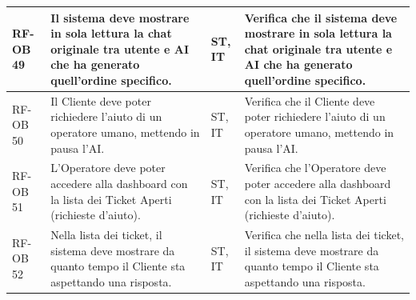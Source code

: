 \documentclass[a4paper,11pt,oneside]{scrartcl}
\begin{document}
\begin{longtable}{|p{1.5cm}|p{4.5cm}|p{1.8cm}|p{6cm}|}
    RF-OB 49         & Il sistema deve mostrare in sola lettura la chat originale tra utente e AI che ha generato quell'ordine specifico.                                                                                                                                                                                    & ST, IT             & Verifica che il sistema deve mostrare in sola lettura la chat originale tra utente e AI che ha generato quell'ordine specifico.                                                                                                                                                                                    \\ \hline
    RF-OB 50         & Il Cliente deve poter richiedere l'aiuto di un operatore umano, mettendo in pausa l'AI.                                                                                                                                                                                                               & ST, IT             & Verifica che il Cliente deve poter richiedere l'aiuto di un operatore umano, mettendo in pausa l'AI.                                                                                                                                                                                                               \\ \hline
    RF-OB 51         & L'Operatore deve poter accedere alla dashboard con la lista dei Ticket Aperti (richieste d'aiuto).                                                                                                                                                                                                    & ST, IT             & Verifica che l'Operatore deve poter accedere alla dashboard con la lista dei Ticket Aperti (richieste d'aiuto).                                                                                                                                                                                                    \\ \hline
    RF-OB 52         & Nella lista dei ticket, il sistema deve mostrare da quanto tempo il Cliente sta aspettando una risposta.                                                                                                                                                                                              & ST, IT             & Verifica che nella lista dei ticket, il sistema deve mostrare da quanto tempo il Cliente sta aspettando una risposta.                                                                                                                                                                                              \\ \hline

\end{longtable}
\end{document}
